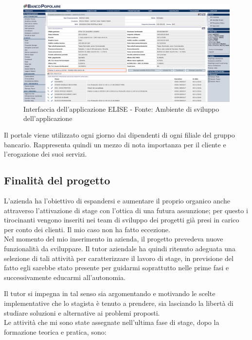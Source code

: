 	\begin{figure}[H]
		\centering
	   	\includegraphics[width=1\textwidth]{immagini/interfaccia_ELISE}
	   	\caption{Interfaccia dell'applicazione ELISE - Fonte: Ambiente di sviluppo dell'applicazione}
	\end{figure}
	
	Il portale viene utilizzato ogni giorno dai dipendenti di ogni filiale del gruppo bancario. Rappresenta quindi un mezzo di nota importanza per il cliente	e l'erogazione dei suoi servizi.
	
	\subsection{Finalità del progetto}
	
	L'azienda ha l'obiettivo di espandersi e aumentare il proprio organico anche attraverso l'attivazione di stage con l'ottica di una futura assunzione; per questo i tirocinanti vengono inseriti nei team di sviluppo dei progetti già presi in carico per conto dei clienti. Il mio caso non ha fatto eccezione. \\
	
	Nel momento del mio inserimento in azienda, il progetto prevedeva nuove funzionalità da sviluppare. Il tutor aziendale ha quindi ritenuto adeguata una selezione di tali attività per caratterizzare il lavoro di stage, in previsione del fatto egli sarebbe stato presente per guidarmi soprattutto nelle prime fasi e successivamente educarmi all'autonomia.
	
	\newpage
	
	Il tutor si impegna in tal senso sia argomentando e motivando le scelte implementative che lo stagista è tenuto a prendere, sia lasciando la libertà di studiare soluzioni e alternative ai problemi proposti.\\
	
	Le attività che mi sono state assegnate nell'ultima fase di stage, dopo la formazione teorica e pratica, sono:

